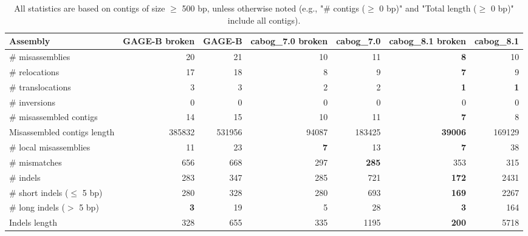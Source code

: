 \documentclass[12pt,a4paper]{article}
\begin{document}
\begin{table}[ht]
\begin{center}
\caption{All statistics are based on contigs of size $\geq$ 500 bp, unless otherwise noted (e.g., "\# contigs ($\geq$ 0 bp)" and "Total length ($\geq$ 0 bp)" include all contigs).}
\begin{tabular}{|l*{6}{|r}|}
\hline
Assembly & GAGE-B broken & GAGE-B & cabog\_7.0 broken & cabog\_7.0 & cabog\_8.1 broken & cabog\_8.1 \\ \hline
\# misassemblies & 20 & 21 & 10 & 11 & {\bf 8} & 10 \\ \hline
\hspace{5mm}\# relocations & 17 & 18 & 8 & 9 & {\bf 7} & 9 \\ \hline
\hspace{5mm}\# translocations & 3 & 3 & 2 & 2 & {\bf 1} & {\bf 1} \\ \hline
\hspace{5mm}\# inversions & 0 & 0 & 0 & 0 & 0 & 0 \\ \hline
\# misassembled contigs & 14 & 15 & 10 & 11 & {\bf 7} & 8 \\ \hline
Misassembled contigs length & 385832 & 531956 & 94087 & 183425 & {\bf 39006} & 169129 \\ \hline
\# local misassemblies & 11 & 23 & {\bf 7} & 13 & {\bf 7} & 38 \\ \hline
\# mismatches & 656 & 668 & 297 & {\bf 285} & 353 & 315 \\ \hline
\# indels & 283 & 347 & 285 & 721 & {\bf 172} & 2431 \\ \hline
\hspace{5mm}\# short indels ($\leq$ 5 bp) & 280 & 328 & 280 & 693 & {\bf 169} & 2267 \\ \hline
\hspace{5mm}\# long indels ($>$ 5 bp) & {\bf 3} & 19 & 5 & 28 & {\bf 3} & 164 \\ \hline
Indels length & 328 & 655 & 335 & 1195 & {\bf 200} & 5718 \\ \hline
\end{tabular}
\end{center}
\end{table}
\end{document}
